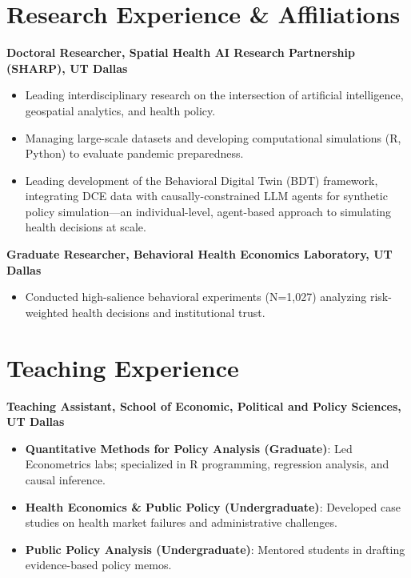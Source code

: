 \documentclass[11pt, letterpaper]{article}
\begin{document}
\section*{Research Experience \& Affiliations}
\textbf{Doctoral Researcher, Spatial Health AI Research Partnership (SHARP), UT Dallas} \\
\begin{itemize}[noitemsep, topsep=0pt, label={-}]
    \item Leading interdisciplinary research on the intersection of artificial intelligence, geospatial analytics, and health policy.
    \item Managing large-scale datasets and developing computational simulations (R, Python) to evaluate pandemic preparedness.
    \item Leading development of the Behavioral Digital Twin (BDT) framework, integrating DCE data with causally-constrained LLM agents for synthetic policy simulation---an individual-level, agent-based approach to simulating health decisions at scale.
\end{itemize}

\vspace{0.5em}
\noindent \textbf{Graduate Researcher, Behavioral Health Economics Laboratory, UT Dallas} \\
\begin{itemize}[noitemsep, topsep=0pt, label={-}]
    \item Conducted high-salience behavioral experiments (N=1,027) analyzing risk-weighted health decisions and institutional trust.
\end{itemize}

\section*{Teaching Experience}
\textbf{Teaching Assistant, School of Economic, Political and Policy Sciences, UT Dallas}
\begin{itemize}[noitemsep, topsep=0pt]
    \item \textbf{Quantitative Methods for Policy Analysis (Graduate)}: Led Econometrics labs; specialized in R programming, regression analysis, and causal inference.
    \item \textbf{Health Economics \& Public Policy (Undergraduate)}: Developed case studies on health market failures and administrative challenges.
    \item \textbf{Public Policy Analysis (Undergraduate)}: Mentored students in drafting evidence-based policy memos.
\end{itemize}
\end{document}
